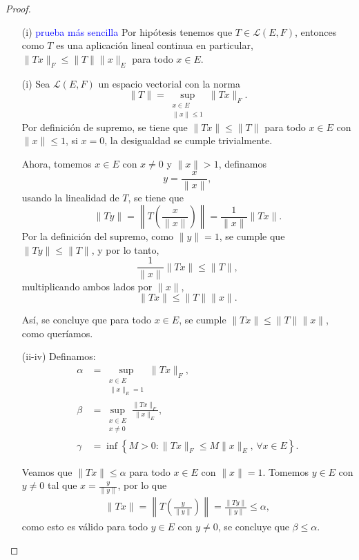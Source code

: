 \begin{proof}
\hfill
\begin{enumerate}
    \item[(i)]
    \textcolor{blue}{prueba más sencilla} Por hipótesis tenemos que $T\in \mathcal{L}(E,F)$, entonces como $T$ es una aplicación lineal continua en particular, $\|Tx\|_F\leq \|T\| \|x\|_E$ para todo $x\in E$.



 \item[(i)]Sea \(\mathcal{L}(E, F)\) un espacio vectorial con la norma
\[
\|T\| = \sup_{\substack{x \in E \\ \| x\| \leq 1}}\|Tx\|_F.
\]
Por definición de supremo, se tiene que \(\|Tx\| \leq \|T\|\) para todo \(x \in E\) con \(\|x\| \leq 1\), si \(x = 0\), la desigualdad se cumple trivialmente. 

Ahora, tomemos \(x \in E\) con \(x \neq 0\) y $\|x\|>1$, definamos
\[
y = \frac{x}{\|x\|},
\]
 usando la linealidad de \(T\), se tiene que
\[
\|Ty\| = \left\|T\left(\frac{x}{\|x\|}\right)\right\| = \frac{1}{\|x\|} \|Tx\|.
\]
Por la definición del supremo, como \(\|y\| = 1\), se cumple que \(\|Ty\| \leq \|T\|\), y por lo tanto,
\[
\frac{1}{\|x\|} \|Tx\| \leq \|T\|,
\]
multiplicando ambos lados por \(\|x\|\),
\[
\|Tx\| \leq \|T\|\|x\|.
\]

Así, se concluye que para todo \(x \in E\), se cumple \(\|Tx\| \leq \|T\|\|x\|\), como queríamos.

\item[(ii-iv)] Definamos:
\begin{align*}
    \alpha &= \sup_{\substack{x\in E\\ \|x\|_E = 1}} \|T x\|_F,\\
    \beta &= \sup_{\substack{x \in E \\ x \neq 0}} \frac{\|T x\|_F}{\|x\|_E},\\
    \gamma &= \inf \left\{ M > 0 : \|T x\|_F \leq M \|x\|_E, \, \forall x \in E \right\}.
\end{align*}

Veamos que \(\|Tx\| \leq \alpha\) para todo \(x \in E\) con \(\|x\| = 1\).  
Tomemos \(y \in E\) con \(y \neq 0\) tal que \(x = \frac{y}{\|y\|}\), por lo que
\begin{align*}
    \|Tx\| = \left\|T\left(\frac{y}{\|y\|}\right)\right\| = \frac{\|Ty\|}{\|y\|} \leq \alpha,
\end{align*}
como esto es válido para todo \(y \in E\) con \(y \neq 0\), se concluye que \(\beta \leq \alpha\).


\end{enumerate}
\end{proof}
